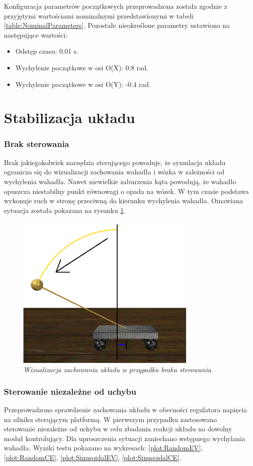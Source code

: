 \documentclass[12pt, twoside, openany]{report}
\theoremstyle{definition}
\begin{document}
Konfiguracja parametrów początkowych przeprowadzona została zgodnie z przyjętymi wartościami nominalnymi przedstawionymi w tabeli \ref{table:NominalParameters}. Pozostałe nieokreślone parametry ustawiono na następujące wartości:
\begin{itemize}
\item Odstęp czasu: 0.01 s.
\item Wychylenie początkowe w osi O(X): 0.8 rad.
\item Wychylenie początkowe w osi O(Y): -0.4 rad.
\end{itemize}

\section{Stabilizacja układu}
\subsubsection{Brak sterowania}
Brak jakiegokolwiek narzędzia sterującego powoduje, że symulacja układu ogranicza się do wizualizacji zachowania wahadła i wózka w zależności od wychylenia wahadła. Nawet niewielkie zaburzenia kąta powodują, że wahadło opuszcza niestabilny punkt równowagi o opada na wózek. W tym czasie podstawa wykonuje ruch w stronę przeciwną do kierunku wychylenia wahadła. Omawiana sytuacja została pokazana na rysunku \ref{figure:ModelWithoutControl}.

\begin{figure}[H]
	\centering
		\includegraphics[width = 250pt]{ModelWithoutControl} 
		\caption{\textit{Wizualizacja zachowania układu w przypadku braku sterowania}}
		\label{figure:ModelWithoutControl}
\end{figure}

\subsubsection{Sterowanie niezależne od uchybu}
Przeprowadzono sprawdzenie zachowania układu w obecności regulatora napięcia na silniku sterującym platformą. W pierwszym przypadku zastosowano sterowanie niezależne od uchybu w celu zbadania reakcji układu na dowolny moduł kontrolujący. Dla uproszczenia sytuacji zaniechano wstępnego wychylania wahadła. Wyniki testu pokazano na wykresach: \ref{plot:RandomEV}, \ref{plot:RandomCE}, \ref{plot:SinusoidalEV}, \ref{plot:SinusoidalCE}.
\end{document}
